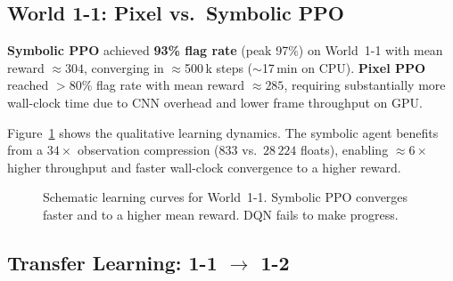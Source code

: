\documentclass[10pt,a4paper,twocolumn]{article}
\begin{document}
\subsection{World 1-1: Pixel vs.\ Symbolic PPO}

\begin{resultbox}
\textbf{Symbolic PPO} achieved \textbf{93\% flag rate} (peak 97\%) on
World~1-1 with mean reward $\approx\!304$, converging in $\approx$500\,k
steps ($\sim$17\,min on CPU).
\textbf{Pixel PPO} reached $>$80\% flag rate with mean reward $\approx\!285$,
requiring substantially more wall-clock time due to CNN overhead and lower
frame throughput on GPU.
\end{resultbox}

Figure~\ref{fig:learning_curves} shows the qualitative learning dynamics.
The symbolic agent benefits from a $34\!\times$ observation compression
($833$ vs.\ $28\,224$ floats), enabling $\approx\!6\!\times$ higher
throughput and faster wall-clock convergence to a higher reward.

\begin{figure}[H]
\centering
{}
\caption{Schematic learning curves for World~1-1. Symbolic PPO converges
faster and to a higher mean reward. DQN fails to make progress.}
\label{fig:learning_curves}
\end{figure}

\subsection{Transfer Learning: 1-1 $\to$ 1-2}
\end{document}
